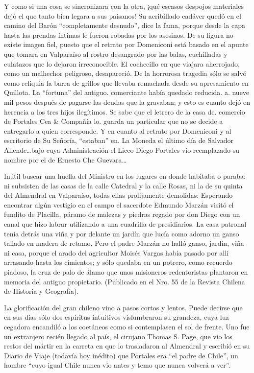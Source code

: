 \documentclass[10pt,twoside,openright]{memoir}
\begin{document}
Y como si una cosa se sincronizara con la otra, ¡qué escasos despojos
materiales dejó el que tanto bien legara a sus paisanos! Su acribillado
cadáver quedó en el camino del Barón ``completamente desnudo'', dice la
fama, porque desde la capa hasta las prendas íntimas le fueron robadas
por los asesinos. De su figura no existe imagen fiel, puesto que el
retrato por Domeniconi está basado en el apunte que tomara en Valparaíso
al rostro desangrado por las balas, cuchilladas y culatazos que lo
dejaron irreconocible. El cochecillo en que viajara aherrojado, como un
malhechor peligroso, desapareció. De la horrorosa tragedia sólo se salvó
como reliquia la barra de grillos que llevaba remachada desde su
apresamiento en Quillota. La ``fortuna'' del antiguo. comerciante había
quedado reducida. a. nueve mil pesos después de pagarse las deudas que
la gravaban; y esto es cuanto dejó en herencia a los tres hijos
ilegítimos. Se sabe que el letrero de la casa de. comercio de Portales
Cea \& Compañía lo. guarda un particular que no se decide a entregarlo a
quien corresponde. Y en cuanto al retrato por Domeniconi y al escritorio
de Su Señoría, ``estaban'' en. La Moneda el último día de Salvador
Allende\ldots bajo cuya Administración el Liceo Diego Portales vio
reemplazado su nombre por el de Ernesto Che Guevara\ldots{}

Inútil buscar una huella del Ministro en los lugares en donde habitaba o
paraba: ni subsisten de las casas de la calle Catedral y la calle Rosas,
ni la de su quinta del Almendral en Valparaíso, todas ellas prolijamente
demolidas: Esperando encontrar algún vestigio en el campo el sacerdote
Edmundo Marzán visitó el fundito de Placilla, páramo de malezas y
piedras regado por don Diego con un canal que hizo labrar utilizando a
una cuadrilla de presidiarios. La casa patronal tenía detrás una viña y
por delante un jardín que lucía como adorno un ganso tallado en madera
de retamo. Pero el padre Marzán no halló ganso, jardín, viña ni casa,
porque el arado del agricultor Moisés Vargas había pasado por allí
arrasando hasta los cimientos; y sólo quedaba en un potrero, como
recuerdo piadoso, la cruz de palo de álamo que unos misioneros
redentoristas plantaron en memoria del antiguo propietario. (Publicado
en el Nro. 55 de la Revista Chilena de Historia y Geografía).

La glorificación del gran chileno vino a pasos cortos y lentos. Puede
decirse que en sus días sólo dos espíritus intuitivos vislumbraron su
grandeza, cuya luz cegadora encandiló a los coetáneos como si
contemplasen el sol de frente. Uno fue un extranjero recién llegado al
país, el cirujano Thomas S. Page, que vio los restos del mártir en la
carreta en que lo trasladaron al Almendral y escribió en su Diario de
Viaje (todavía hoy inédito) que Portales era ``el padre de Chile'', un
hombre ``cuyo igual Chile nunca vio antes y temo que nunca volverá a
ver''.
\end{document}
